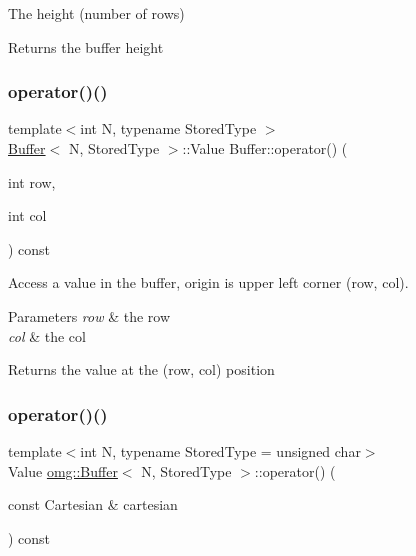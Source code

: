 The height (number of rows) 

\begin{DoxyReturn}{Returns}
the buffer height 
\end{DoxyReturn}
\mbox{\label{classomg_1_1_buffer_ae9b4a3c2c3357ca29b1b1847c303b1f7}} 
\subsubsection{\texorpdfstring{operator()()}{operator()()}\hspace{0.1cm}{\footnotesize\ttfamily [1/4]}}
{\footnotesize\ttfamily template$<$int N, typename Stored\+Type $>$ \\
\mbox{\hyperlink{classomg_1_1_buffer}{Buffer}}$<$ N, Stored\+Type $>$\+::Value Buffer\+::operator() (\begin{DoxyParamCaption}\item[{int}]{row,  }\item[{int}]{col }\end{DoxyParamCaption}) const}



Access a value in the buffer, origin is upper left corner (row, col). 


\begin{DoxyParams}{Parameters}
{\em row} & the row \\
\hline
{\em col} & the col \\
\hline
\end{DoxyParams}
\begin{DoxyReturn}{Returns}
the value at the (row, col) position 
\end{DoxyReturn}
\mbox{\label{classomg_1_1_buffer_ace3b3a40c6fbc8909af82638b9277a47}} 
\subsubsection{\texorpdfstring{operator()()}{operator()()}\hspace{0.1cm}{\footnotesize\ttfamily [2/4]}}
{\footnotesize\ttfamily template$<$int N, typename Stored\+Type = unsigned char$>$ \\
Value \mbox{\hyperlink{classomg_1_1_buffer}{omg\+::\+Buffer}}$<$ N, Stored\+Type $>$\+::operator() (\begin{DoxyParamCaption}\item[{const Cartesian \&}]{cartesian }\end{DoxyParamCaption}) const}



